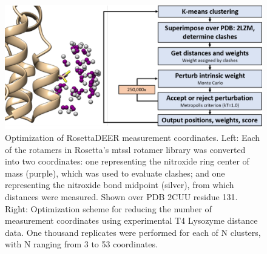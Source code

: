 \begin{figure}[h]
\centering
\includegraphics[width=6in]{Figures/rosettadeer_supp_scheme.pdf}
 \caption[Optimization of RosettaDEER measurement coordinates.]{Optimization of RosettaDEER measurement coordinates. Left: Each of the rotamers in Rosetta’s \gls{mtssl} rotamer library was converted into two coordinates: one representing the nitroxide ring center of mass (purple), which was used to evaluate clashes; and one representing the nitroxide bond midpoint (silver), from which distances were measured. Shown over PDB 2CUU residue 131. Right: Optimization scheme for reducing the number of measurement coordinates using experimental T4 Lysozyme distance data. One thousand replicates were performed for each of N clusters, with N ranging from 3 to 53 coordinates.}
\label{fig:rosettadeer_supp_scheme}
\end{figure}

